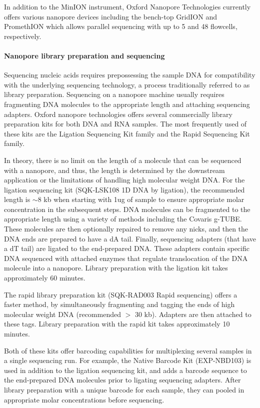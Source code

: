 In addition to the MinION instrument, Oxford Nanopore Technologies
currently offers various nanopore devices including the bench-top
GridION and PromethION which allows parallel sequencing with up to 5 and
48 flowcells, respectively.


\paragraph{Nanopore library preparation and sequencing}
Sequencing nucleic acids requires prepossessing the sample DNA for
compatibility with the underlying sequencing technology, a process
traditionally referred to as library preparation.
%
Sequencing on a nanopore machine usually requires fragmenting DNA
molecules to the appropriate length and attaching sequencing adapters.
%
Oxford nanopore technologies offers several commercially library
preparation kits for both DNA and RNA samples.  The most frequently used
of these kits are the Ligation Sequencing Kit family and the Rapid
Sequencing Kit family.

In theory, there is no limit on the length of a molecule that can be
sequenced with a nanopore, and thus, the length is determined by the
downstream application or the limitations of handling high molecular
weight DNA. For the ligation sequencing kit (SQK-LSK108 1D DNA by
ligation), the recommended length is
$\sim$8 kb when starting with 1ug of sample to ensure appropriate molar
concentration in the subsequent steps.  DNA molecules can be fragmented
to the appropriate length using a variety of methods including the
Covaris g-TUBE.
%
These molecules are then optionally repaired to remove any nicks, and
then the DNA ends are prepared to have a dA tail. Finally, sequencing
adapters (that have a dT tail) are ligated to the end-prepared DNA.
These adapters contain specific DNA sequenced with attached enzymes
that regulate translocation of the DNA molecule into a nanopore.
Library preparation with the ligation kit takes approximately 60 minutes.

The rapid library preparation kit (SQK-RAD003 Rapid sequencing) offers a
faster method, by simultaneously fragmenting and tagging the ends of
high molecular weight DNA (recommended $>$ 30 kb). Adapters are then
attached to these tags.  Library preparation with the rapid kit takes
approximately 10 minutes.

Both of these kits offer barcoding capabilities for multiplexing several
samples in a single sequencing run. For example, the Native Barcode Kit
(EXP-NBD103) is used in addition to the ligation sequencing kit, and
adds a barcode sequence to the end-prepared DNA molecules prior to
ligating sequencing adapters. After library preparation with a unique
barcode for each sample, they can pooled in appropriate molar
concentrations before sequencing.

